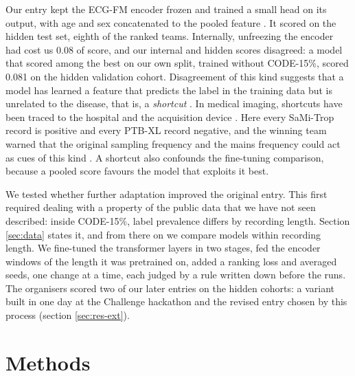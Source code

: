 \documentclass{iopjournal}
\begin{document}
Our entry kept the ECG-FM encoder \citep{mckeen2025} frozen and trained a small head on its output, with age and sex concatenated to the pooled feature \citep{nguyen2025}. It scored \extOrigMean{} on the hidden test set, eighth of the ranked teams.
Internally, unfreezing the encoder had cost us 0.08 of score, and our internal and hidden scores disagreed: a model that scored among the best on our own split, trained without CODE-15\%, scored 0.081 on the hidden validation cohort.
Disagreement of this kind suggests that a model has learned a feature that predicts the label in the training data but is unrelated to the disease, that is, a \emph{shortcut} \citep{geirhos2020}. In medical imaging, shortcuts have been traced to the hospital and the acquisition device \citep{zech2018,degrave2021}. Here every SaMi-Trop record is positive and every PTB-XL record negative, and the winning team warned that the original sampling frequency and the mains frequency could act as cues of this kind \citep{vansantvliet2025}. A shortcut also confounds the fine-tuning comparison, because a pooled score favours the model that exploits it best.

We tested whether further adaptation improved the original entry. This first required dealing with a property of the public data that we have not seen described: inside CODE-15\%, label prevalence differs by recording length. Section \ref{sec:data} states it, and from there on we compare models within recording length. We fine-tuned the transformer layers in two stages, fed the encoder windows of the length it was pretrained on, added a ranking loss and averaged seeds, one change at a time, each judged by a rule written down before the runs. The organisers scored two of our later entries on the hidden cohorts: a variant built in one day at the Challenge hackathon and the revised entry chosen by this process (section \ref{sec:res-ext}).

\section{Methods}
\end{document}
